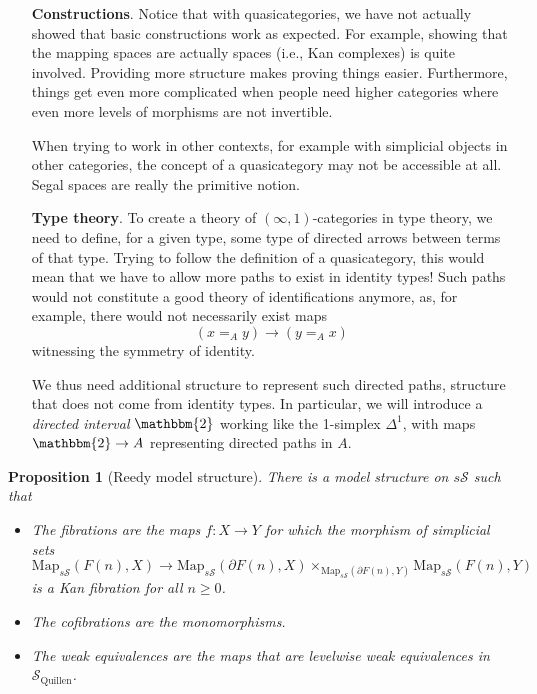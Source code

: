 \documentclass{article}
\newcommand{\cS}{\mathcal{S}}
\newcommand{\sS}{s\cS}
\newcommand{\Map}{\mathrm{Map}}
\newtheorem{prop}[subsection]{Proposition}
\theoremstyle{definition}
\begin{document}
\begin{itemize}
    \item[\textbf{Constructions}.] Notice that with quasicategories, we have not actually showed that basic constructions work as expected. For example, showing that the mapping spaces are actually spaces (i.e., Kan complexes) is quite involved. Providing more structure makes proving things easier. Furthermore, things get even more complicated when people need higher categories where even more levels of morphisms are not invertible. \par
    When trying to work in other contexts, for example with simplicial objects in other categories, the concept of a quasicategory may not be accessible at all.  Segal spaces are really the primitive notion.
    \item[\textbf{Type theory}.] To create a theory of $(\infty,1)$-categories in type theory, we need to define, for a given type, some type of directed arrows between terms of that type. Trying to follow the definition of a quasicategory, this would mean that we have to allow more paths to exist in identity types! Such paths would not constitute a good theory of identifications anymore, as, for example, there would not necessarily exist maps $$(x=_Ay)\to (y=_Ax)$$ witnessing the symmetry of identity. 
    \par We thus need additional structure to represent such directed paths, structure that does not come from identity types. In particular, we will introduce a \textit{directed interval} $\mathbbm{2}$ working like the 1-simplex $\Delta^1$, with maps $\mathbbm{2}\to A$ representing directed paths in $A$. 
\end{itemize}

\begin{prop}[Reedy model structure]
    There is a model structure on $\sS$ such that
    \begin{itemize}
        \item The fibrations are the maps $f:X\to Y$ for which the morphism of simplicial sets $$\Map_{\sS}(F(n),X)\to \Map_{\sS}(\partial F(n), X)\times_{\Map_{\sS}(\partial F(n),Y)}\Map_{\sS}(F(n),Y)$$ is a Kan fibration for all $n\geq 0$. 
        \item The cofibrations are the monomorphisms.
        \item The weak equivalences are the maps that are levelwise weak equivalences in $\cS_{\text{Quillen}}$.
    \end{itemize}
\end{prop}
\end{document}
